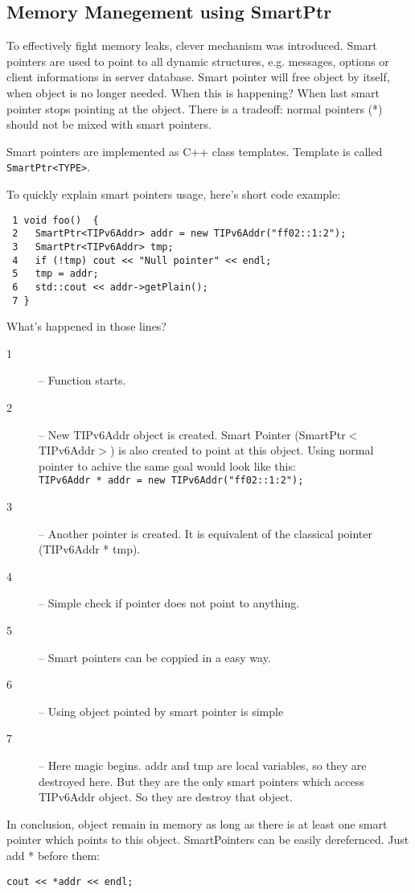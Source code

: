 \subsection{Memory Manegement using SmartPtr}
To effectively fight memory leaks, clever mechanism was
introduced. Smart pointers are used to point to all dynamic
structures, e.g. messages, options or client informations in server
database. Smart pointer will free object by itself, when object is no
longer needed. When this is happening? When last smart pointer stops
pointing at the object. There is a tradeoff: normal pointers (*)
should not be mixed with smart pointers. 

Smart pointers are implemented as C++ class templates. Template is
called \verb+SmartPtr<TYPE>+.

To quickly explain smart pointers usage, here's short code example:
\begin{verbatim}
 1 void foo()  {
 2   SmartPtr<TIPv6Addr> addr = new TIPv6Addr("ff02::1:2");
 3   SmartPtr<TIPv6Addr> tmp;
 4   if (!tmp) cout << "Null pointer" << endl;
 5   tmp = addr;
 6   std::cout << addr->getPlain();
 7 }
\end{verbatim}
What's happened in those lines?
\begin{description}
\item[1] -- Function starts.
\item[2] -- New TIPv6Addr object is created. Smart Pointer
  (SmartPtr$<$TIPv6Addr$>$) is also created to point at this object. Using
  normal pointer to achive the same goal would look like this: \\
  \verb+TIPv6Addr * addr = new TIPv6Addr("ff02::1:2");+
\item[3] -- Another pointer is created. It is equivalent of the
  classical pointer (TIPv6Addr * tmp).
\item[4] -- Simple check if pointer does not point to anything.
\item[5] -- Smart pointers can be coppied in a easy way.
\item[6] -- Using object pointed by smart pointer is simple
\item[7] -- Here magic begins. addr and tmp are local variables, so
  they are destroyed here. But they are the only smart pointers which
  access TIPv6Addr object. So they are destroy that object. 
\end{description}

In conclusion, object remain in memory as long as there is at least
one smart pointer which points to this object. SmartPointers can be
easily derefernced. Just add * before them:
\begin{verbatim}
cout << *addr << endl;
\end{verbatim}

